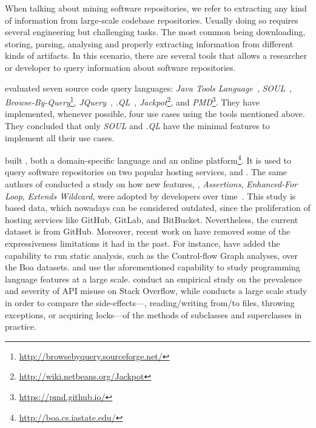 When talking about mining software repositories,
we refer to extracting any kind of information from large-scale codebase repositories. 
Usually doing so requires several engineering but challenging tasks.
The most common being downloading, storing, parsing, analysing and
properly extracting information from different kinds of artifacts.
In this scenario, there are several tools that allows a researcher or developer to query information about software repositories.

\cite{urmaProgrammingLanguageEvolution2012} evaluated seven source code
query languages:
\emph{Java Tools Language}~\citep{cohenJTLJavaTools},
\emph{SOUL}~\citep{derooverSOULToolSuite2011},
\emph{Browse-By-Query}\footnote{\url{http://browsebyquery.sourceforge.net/}},
\emph{JQuery}~\citep{volderJqueryGenericCode2006},
\emph{.QL}~\citep{moorKeynoteAddressQL2007},
\emph{Jackpot}\footnote{\url{http://wiki.netbeans.org/Jackpot}}, and
\emph{PMD}\footnote{\url{https://pmd.github.io/}}.
They have implemented, whenever possible,
four use cases using the tools mentioned above.
They concluded that only \emph{SOUL} and \emph{.QL} have the minimal features to implement all their use cases.

\cite{dyerBoaLanguageInfrastructure2013,dyerDeclarativeVisitorsEase2013} built \boa{}, both a domain-specific language and an online platform\footnote{\url{http://boa.cs.iastate.edu/}}. 
It is used to query software repositories on two popular hosting services, \github{} and \sourceforge{}.
The same authors of \boa{} conducted a study on
how new \java{} features, \eg,
\emph{Assertions},
\emph{Enhanced-For Loop},
\emph{Extends Wildcard},
were adopted by developers over time~\citep{dyerMiningBillionsAST2014}.
This study is based \sourceforge{} data,
which nowadays can be considered outdated,
since the proliferation of hosting services like
GitHub, GitLab, and BitBucket.
Nevertheless, 
the current \boa{} dataset is from GitHub.
Moreover,
recent work on \boa{} have removed some of the expressiveness limitations it had in the past.
For instance,
\cite{collective2018,Ramu:2018:HTE:3183440.3195033}
have added the capability to run static analysis,
such as the Control-flow Graph analyses,
over the Boa datasets.
\cite{ReliableQA2018} and \cite{maddox18}
use the aforementioned \boa{} capability to study programming language features at a large scale.
\cite{ReliableQA2018} conduct an empirical study on the prevalence and severity of API misuse on Stack Overflow,
while \cite{maddox18} conducts a large scale study in order to compare the
side-effects---\eg{}, reading/writing from/to files, throwing exceptions, or acquiring locks---of the methods of subclasses and superclasses in practice.

